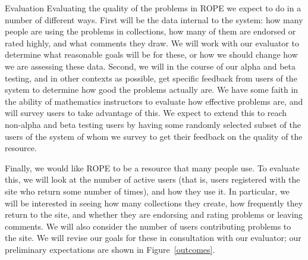 \documentclass[11pt]{article}
\begin{document}
\begin{section}{Evaluation}
Evaluating the quality of the problems in ROPE we expect to do in a number
of different ways.  First will be the data internal to the system: how
many people are using the problems in collections, how many of them are
endorsed or rated highly, and what comments they draw.  We will work with
our evaluator to determine what reasonable goals will be for these, or how
we should change how we are assessing these data.  Second, we will in the
course of our alpha and beta testing, and in other contexts as possible,
get specific feedback from users of the system to determine how good the
problems actually are.  We have some faith in the ability of mathematics
instructors to evaluate how effective problems are, and will survey users
to take advantage of this.  We expect to extend this to reach non-alpha
and beta testing users by having some randomly selected subset of the
users of the system of whom we survey to get their feedback on the
quality of the resource.

Finally, we would like ROPE to be a resource that many people use.  To
evaluate this, we will look at the number of active users (that is, users
registered with the site who return some number of times), and how they
use it.  In particular, we will be interested in seeing how many
collections they create, how frequently they return to the site, and
whether they are endorsing and rating problems or leaving comments.  We
will also consider the number of users contributing problems to the site.
We will revise our goals for these in consultation with our evaluator; our
preliminary expectations are shown in Figure~\ref{outcomes}.



\end{section}
\end{document}
